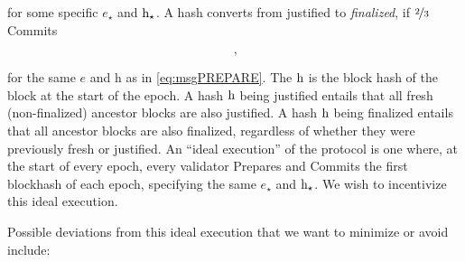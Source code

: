 \documentclass[12pt, final]{article}
\newcommand{\epoch}{\ensuremath{e}\xspace}
\newcommand{\hash}{\textnormal{h}\xspace}
\newcommand{\hashsource}{\ensuremath{\hash_{\star}}\xspace}
\newcommand{\epochsource}{\ensuremath{\epoch_{\star}}\xspace}
\newcommand{\signature}{\ensuremath{\mathcal{S}}\xspace}
\newcommand{\msgPREPARE}{\textbf{\textsc{prepare}}\xspace}
\newcommand{\msgCOMMIT}{\textbf{\textsc{commit}}\xspace}
\begin{document}
\begin{equation}
[\msgPREPARE, \epoch, \hash, \epochsource, \hashsource, \signature]
\label{eq:msgPREPARE}
\end{equation}

for some specific $\epochsource$ and $\hashsource$.  A hash converts from justified to \emph{finalized}, if $\nicefrac{2}{3}$ Commits  

\begin{equation}
[\msgCOMMIT, \epoch, \hash, \signature] \; ,
\label{eq:msgCOMMIT}
\end{equation}

for the same \epoch and \hash as in \eqref{eq:msgPREPARE}.  The $\hash$ is the block hash of the block at the start of the epoch.  A hash $\hash$ being justified entails that all fresh (non-finalized) ancestor blocks are also justified.  A hash $\hash$ being finalized entails that all ancestor blocks are also finalized, regardless of whether they were previously fresh or justified.  An ``ideal execution'' of the protocol is one where, at the start of every epoch, every validator Prepares and Commits the first blockhash of each epoch, specifying the same $\epochsource$ and $\hashsource$. We wish to incentivize this ideal execution.

Possible deviations from this ideal execution that we want to minimize or avoid include:
\end{document}
